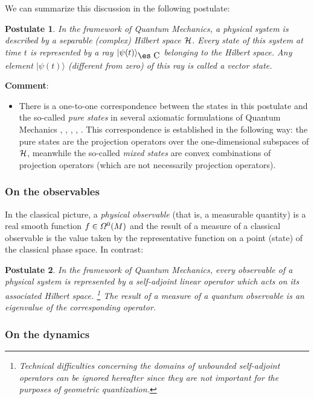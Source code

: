 \documentclass[12pt]{article}
\theoremstyle{plain}
\newtheorem{post}{Postulate}
\def\H{{\cal H}}
\def\Complex{\mbox{\es C}}
\begin{document}
We can summarize this discussion in the following postulate:

\begin{post}
In the framework of Quantum Mechanics, a physical system is described by
a
{\it separable (complex) Hilbert space} $\H$.
Every state of this system at time $t$ is represented by a
{\it ray} $|\psi (t) \rangle_{\Complex}$ belonging to the Hilbert space.
Any element $|\psi (t) \rangle $ (different from zero) of this ray is
called a {\rm vector state}.
\label{pos1}
\end{post}
{\bf Comment}:
\begin{itemize}
\item
There is a one-to-one correspondence between
the states in this postulate and the so-called
{\it pure states} in several axiomatic formulations of Quantum Mechanics
\cite{Mk-mfqm}, \cite{Mo-qmdo}, \cite{Se-pgqm}, \cite{Vn-mfqm},
\cite{Wl-tgqm}.
This correspondence is established in the following way:
the pure states are the projection operators over the one-dimensional
subspaces of $\H$,
meanwhile the so-called {\it mixed states} are convex combinations of
projection operators
(which are not necessarily  projection operators).
\end{itemize}


\subsubsection{On the observables}


In the classical picture, a {\it physical observable}
(that is, a measurable quantity) is a real smooth function
$f \in {\mit\Omega}^0(M)$ and the result of
a measure of a classical observable is the value taken by the
representative
function on a point (state) of the classical phase space.
In contrast:

\begin{post}
In the framework of Quantum Mechanics,
every observable of a physical system is represented by a
{\it self-adjoint linear operator} which acts on its associated Hilbert
space.%
\footnote{
Technical difficulties concerning the domains of unbounded self-adjoint
operators
can be ignored hereafter since they are not important
for the purposes of geometric quantization.
}
The result of a measure of a quantum observable
is an eigenvalue of the corresponding operator.
\label{pos2}
\end{post}


\subsubsection{On the dynamics}
\end{document}
